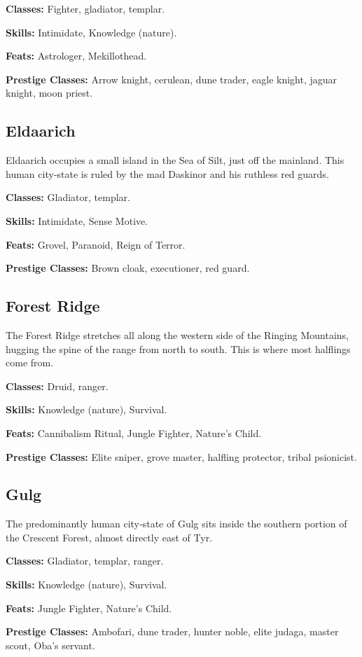 \textbf{Classes:} Fighter, gladiator, templar.

\textbf{Skills:} Intimidate, Knowledge (nature).

\textbf{Feats:} Astrologer, Mekillothead.

\textbf{Prestige Classes:} Arrow knight, cerulean, dune trader, eagle knight, jaguar knight, moon priest.

\subsection{Eldaarich}
Eldaarich occupies a small island in the Sea of Silt, just off the mainland. This human city‐state is ruled by the mad Daskinor and his ruthless red guards.

\textbf{Classes:} Gladiator, templar.

\textbf{Skills:} Intimidate, Sense Motive.

\textbf{Feats:} Grovel, Paranoid, Reign of Terror.

\textbf{Prestige Classes:} Brown cloak, executioner, red guard.


\subsection{Forest Ridge}
The Forest Ridge stretches all along the western side of the Ringing Mountains, hugging the spine of the range from north to south. This is where most halflings come from.

\textbf{Classes:} Druid, ranger.

\textbf{Skills:} Knowledge (nature), Survival.

\textbf{Feats:} Cannibalism Ritual, Jungle Fighter, Nature's Child.

\textbf{Prestige Classes:} Elite sniper, grove master, halfling protector, tribal psionicist.


\subsection{Gulg}
The predominantly human city‐state of Gulg sits inside the southern portion of the Crescent Forest, almost directly east of Tyr.

\textbf{Classes:} Gladiator, templar, ranger.

\textbf{Skills:} Knowledge (nature), Survival.

\textbf{Feats:} Jungle Fighter, Nature's Child.

\textbf{Prestige Classes:} Ambofari, dune trader, hunter noble, elite judaga, master scout, Oba's servant.


